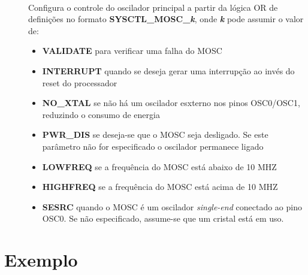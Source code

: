 \begin{description}
	\item []\hfill \\
	Configura o controle do oscilador principal a partir da lógica OR de definições no formato \textbf{SYSCTL\_MOSC\_\emph{k}}, onde \textbf{\emph{k}} pode assumir o valor de:
	\begin{itemize}
		\item \textbf{VALIDATE} para verificar uma falha do MOSC
		\item \textbf{INTERRUPT} quando se deseja gerar uma interrupção ao invés do reset do processador
		\item \textbf{NO\_XTAL} se não há um oscilador esxterno nos pinos OSC0/OSC1, reduzindo o consumo de energia
		\item \textbf{PWR\_DIS} se deseja-se que o MOSC seja desligado. Se este parâmetro não for especificado o oscilador permanece ligado
		\item \textbf{LOWFREQ} se a frequência do MOSC está abaixo de 10 MHZ
		\item \textbf{HIGHFREQ} se a frequência do MOSC está acima de 10 MHZ
		\item \textbf{SESRC} quando o MOSC é um oscilador \emph{single-end} conectado ao pino OSC0. Se não especificado, assume-se que um cristal está em uso.
	\end{itemize}

\end{description}

\section{Exemplo}
